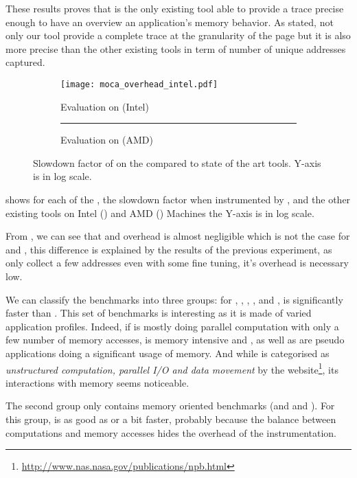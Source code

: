 These results proves that \Moca is the only existing tool able to provide a
trace precise enough to have an overview an application's memory behavior. As
stated, not only our tool provide a complete trace at the granularity of the
page but it is also more precise than the other existing tools in term of
number of unique addresses captured.

\begin{figure}[htb]
    \centering
    \begin{subfigure}{\linewidth}
        \texttt{[image: moca\_overhead\_intel.pdf]}
        \caption{Evaluation on \Edel (Intel)}
        \label{fig:ovh-Intel}
    \end{subfigure}
    \begin{subfigure}{\linewidth}
        \rule{8cm}{6cm}
        \caption{Evaluation on \Idfreeze (AMD)}
        \label{fig:ovh-AMD}
    \end{subfigure}
    \caption{Slowdown factor of \Moca on the \NPB compared to state of the art tools.
    Y-axis is in log scale.}
    \label{fig:ovh}
\end{figure}

 shows for each of the \NPB, the slowdown factor when
instrumented by \Moca, \MocaPin and the other existing tools on Intel
() and AMD () Machines the Y-axis is in
log scale.

From , we can see that \Mitos and \MitosTun overhead is
almost negligible which is not the case for \Moca and \TABARNAC, this
difference is explained by the results of the previous experiment, as \Mitos
only collect a few addresses even with some fine tuning, it's overhead is
necessary low.

We can classify the benchmarks into three groups:
for \BT, \CG, \EP, \LU, \SP and \UA, \Moca is
significantly faster than \TABARNAC. This set of benchmarks is interesting as it is made of varied application profiles.
Indeed, if \EP is mostly doing parallel computation with only a few number of
memory accesses, \CG is memory intensive and
\BT, \LU as well as \SP are pseudo applications doing a significant usage of memory.
And while \UA is categorised as \emph{unstructured computation,
parallel I/O and data movement} by the \NPB
website\footnote{\url{http://www.nas.nasa.gov/publications/npb.html}}, its
interactions with memory seems noticeable.

The second group only contains memory oriented benchmarks (\DC and \FT and
\IS). For this group, \Moca is as good as \TABARNAC or a bit faster, probably
because the balance between computations and memory accesses hides the
overhead of the instrumentation.


